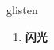 
\begin{frame}
{\huge glisten}
\begin{center}
\begin{enumerate}\Large
  \item \textbf{闪光}
\end{enumerate}
\end{center}
\end{frame}
